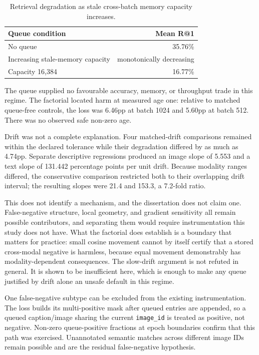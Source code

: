 \documentclass[11pt,a4paper,oneside]{report}
\begin{document}
\begin{table}[htbp]
\centering
\caption{Retrieval degradation as stale cross-batch memory capacity increases.}
\label{tab:queue}
\begin{tabular}{L{7.5cm}r}
\toprule
Queue condition & Mean R@1 \\
\midrule
No queue & 35.76\% \\
Increasing stale-memory capacity & monotonically decreasing \\
Capacity 16,384 & 16.77\% \\
\bottomrule
\end{tabular}
\end{table}
The queue supplied no favourable accuracy, memory, or throughput trade in this regime. The factorial located harm at measured age one: relative to matched queue-free controls, the loss was 6.46pp at batch 1024 and 5.60pp at batch 512. There was no observed safe non-zero age.

Drift was not a complete explanation. Four matched-drift comparisons remained within the declared tolerance while their degradation differed by as much as 4.74pp. Separate descriptive regressions produced an image slope of 5.553 and a text slope of 131.442 percentage points per unit drift. Because modality ranges differed, the conservative comparison restricted both to their overlapping drift interval; the resulting slopes were 21.4 and 153.3, a 7.2-fold ratio.

This does not identify a mechanism, and the dissertation does not claim one. False-negative structure, local geometry, and gradient sensitivity all remain possible contributors, and separating them would require instrumentation this study does not have. What the factorial does establish is a boundary that matters for practice: small cosine movement cannot by itself certify that a stored cross-modal negative is harmless, because equal movement demonstrably has modality-dependent consequences. The slow-drift argument is not refuted in general. It is shown to be insufficient here, which is enough to make any queue justified by drift alone an unsafe default in this regime.

One false-negative subtype can be excluded from the existing instrumentation. The loss builds its multi-positive mask after queued entries are appended, so a queued caption/image sharing the current \texttt{image\_\linebreak[1]id} is treated as positive, not negative. Non-zero queue-positive fractions at epoch boundaries confirm that this path was exercised. Unannotated semantic matches across different image IDs remain possible and are the residual false-negative hypothesis.
\end{document}
